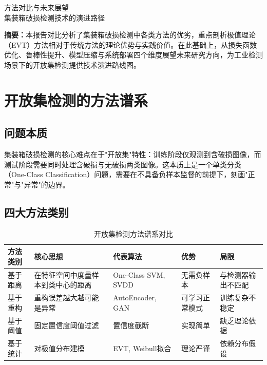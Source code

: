 \documentclass[12pt,a4paper]{ctexart}
\theoremstyle{cumcm}
\begin{document}
\begin{center}
{\heiti 方法对比与未来展望}\\[0.5em]
{ 集装箱破损检测技术的演进路径}
\end{center}

\vspace{1em}

\noindent\textbf{摘要：}本报告对比分析了集装箱破损检测中各类方法的优劣，重点剖析极值理论（EVT）方法相对于传统方法的理论优势与实践价值。在此基础上，从损失函数优化、鲁棒性提升、模型压缩与系统部署四个维度展望未来研究方向，为工业检测场景下的开放集检测提供技术演进路线图。

\section{开放集检测的方法谱系}

\subsection{问题本质}

集装箱破损检测的核心难点在于"开放集"特性：训练阶段仅观测到含破损图像，而测试阶段需要同时处理含破损与无破损两类图像。这本质上是一个单类分类（One-Class Classification）问题，需要在不具备负样本监督的前提下，刻画"正常"与"异常"的边界。

\subsection{四大方法类别}

\begin{table}[H]
\centering
{}
\caption{开放集检测方法谱系对比}
\begin{tabularx}{\textwidth}{lXXXX}
\toprule
\textbf{方法类别} & \textbf{核心思想} & \textbf{代表算法} & \textbf{优势} & \textbf{局限} \\
\midrule
基于距离 & 在特征空间中度量样本到类中心的距离 & One-Class SVM, SVDD & 无需负样本 & 与检测器输出不匹配 \\
基于重构 & 重构误差越大越可能是异常 & AutoEncoder, GAN & 可学习正常模式 & 训练复杂不稳定 \\
基于阈值 & 固定置信度阈值过滤 & 置信度截断 & 实现简单 & 缺乏理论依据 \\
基于统计 & 对极值分布建模 & EVT, Weibull拟合 & 理论严谨 & 依赖分布假设 \\
\bottomrule
\end{tabularx}
\end{table}
\end{document}
